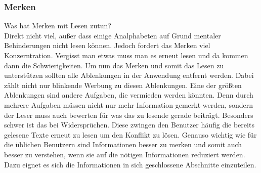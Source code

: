 \subsubsection{Merken}
Was hat Merken mit Lesen zutun?\\
Direkt nicht viel, außer dass einige Analphabeten auf Grund mentaler Behinderungen nicht lesen können. Jedoch fordert das Merken viel Konzerntration. Vergisst man etwas muss man es erneut lesen und da kommen dann die Schwierigkeiten. Um nun das Merken und somit das Lesen zu unterstützen sollten alle Ablenkungen in der Anwendung entfernt werden. 
Dabei zählt nicht nur blinkende Werbung zu diesen Ablenkungen. Eine der größten Ablenkungen sind andere Aufgaben, die vermieden werden könnten. Denn durch mehrere Aufgaben müssen nicht nur mehr Information gemerkt werden, sondern der Leser muss auch bewerten für was das zu lesende gerade beiträgt. Besonders schwer ist das bei Widersprüchen. Diese zwingen den Benutzer häufig die bereits gelesene Texte erneut zu lesen um den Konflikt zu lösen. Genauso wichtig wie für die üblichen Benutzern sind Informationen besser zu merken und somit auch besser zu verstehen, wenn sie auf die nötigen Informationen reduziert werden. Dazu eignet es sich die Informationen in sich geschlossene Abschnitte einzuteilen.

